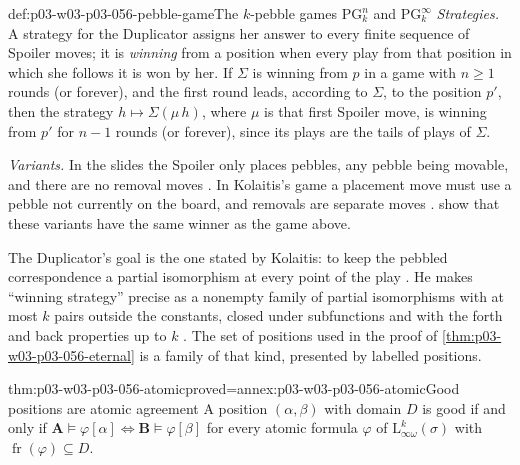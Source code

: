 \begin{hbdefinition}{def:p03-w03-p03-056-pebble-game}{The \(k\)-pebble games \(\mathrm{PG}^n_k\) and \(\mathrm{PG}^\infty_k\)}
\emph{Strategies.} A strategy for the Duplicator assigns her answer to every
finite sequence of Spoiler moves; it is \emph{winning} from a position when
every play from that position in which she follows it is won by her. If
\(\Sigma\) is winning from \(p\) in a game with \(n\geq1\) rounds (or
forever), and the first round leads, according to \(\Sigma\), to the
position \(p'\), then the strategy
\(h\mapsto\Sigma(\mu\,h)\), where \(\mu\) is that first Spoiler move, is
winning from \(p'\) for \(n-1\) rounds (or forever), since its plays are the
tails of plays of \(\Sigma\).

\emph{Variants.} In the slides the Spoiler only places pebbles, any pebble
being movable, and there are no removal moves
\cite[pp.~10--11]{TechnionLMC2009Lecture4}. In Kolaitis's game a placement
move must use a pebble not currently on the board, and removals are
separate moves \cite[Def.~7.3, p.~55]{Kolaitis2003ExpressivePowerNotes}.
 show
that these variants have the same winner as the game above.
\end{hbdefinition}

The Duplicator's goal is the one stated by Kolaitis: to keep the pebbled
correspondence a partial isomorphism at every point of the play
\cite[Def.~7.3, p.~55]{Kolaitis2003ExpressivePowerNotes}. He makes
``winning strategy'' precise as a nonempty family of partial isomorphisms
with at most \(k\) pairs outside the constants, closed under subfunctions
and with the forth and back properties up to \(k\)
\cite[Def.~7.4, p.~55]{Kolaitis2003ExpressivePowerNotes}. The set of
positions used in the proof of \cref{thm:p03-w03-p03-056-eternal} is a family
of that kind, presented by labelled positions.

\begin{hblemma}{thm:p03-w03-p03-056-atomic}{proved=annex:p03-w03-p03-056-atomic}{Good positions are atomic agreement}
A position \((\alpha,\beta)\) with domain \(D\) is good if and only if
\(\mathbf A\models\varphi[\alpha]\iff\mathbf B\models\varphi[\beta]\) for
every atomic formula \(\varphi\) of \(\mathrm{L}^k_{\infty\omega}(\sigma)\)
with \(\operatorname{fr}(\varphi)\subseteq D\).
\end{hblemma}

